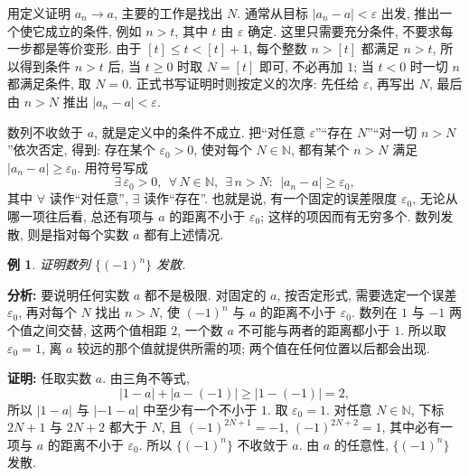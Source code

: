 \documentclass[UTF8,openany]{ctexbook}
\theoremstyle{chinesetextbook}
\newtheorem{example}{例}[section]
\newenvironment{cnproof}{\par\indent\textbf{证明:} \ignorespaces}{\par}
\begin{document}
用定义证明 $a_n\to a$, 主要的工作是找出 $N$. 通常从目标 $|a_n-a|<\varepsilon$ 出发, 推出一个使它成立的条件, 例如 $n>t$, 其中 $t$ 由 $\varepsilon$ 确定. 这里只需要充分条件, 不要求每一步都是等价变形. 由于 $[t]\le t<[t]+1$, 每个整数 $n>[t]$ 都满足 $n>t$, 所以得到条件 $n>t$ 后, 当 $t\ge0$ 时取 $N=[t]$ 即可, 不必再加 $1$; 当 $t<0$ 时一切 $n$ 都满足条件, 取 $N=0$. 正式书写证明时则按定义的次序: 先任给 $\varepsilon$, 再写出 $N$, 最后由 $n>N$ 推出 $|a_n-a|<\varepsilon$.

数列不收敛于 $a$, 就是定义中的条件不成立. 把“对任意 $\varepsilon$”“存在 $N$”“对一切 $n>N$”依次否定, 得到: 存在某个 $\varepsilon_0>0$, 使对每个 $N\in\mathbb N$, 都有某个 $n>N$ 满足 $|a_n-a|\ge\varepsilon_0$. 用符号写成
\[
\exists\,\varepsilon_0>0,\ \ \forall\,N\in\mathbb N,\ \ \exists\,n>N:\ \ |a_n-a|\ge\varepsilon_0,
\]
其中 $\forall$ 读作“对任意”, $\exists$ 读作“存在”. 也就是说, 有一个固定的误差限度 $\varepsilon_0$, 无论从哪一项往后看, 总还有项与 $a$ 的距离不小于 $\varepsilon_0$; 这样的项因而有无穷多个. 数列发散, 则是指对每个实数 $a$ 都有上述情况.
\begin{example}
证明数列 $\{(-1)^n\}$ 发散.
\end{example}
\par\indent\textbf{分析:} 要说明任何实数 $a$ 都不是极限. 对固定的 $a$, 按否定形式, 需要选定一个误差 $\varepsilon_0$, 再对每个 $N$ 找出 $n>N$, 使 $(-1)^n$ 与 $a$ 的距离不小于 $\varepsilon_0$. 数列在 $1$ 与 $-1$ 两个值之间交替, 这两个值相距 $2$, 一个数 $a$ 不可能与两者的距离都小于 $1$. 所以取 $\varepsilon_0=1$, 离 $a$ 较远的那个值就提供所需的项; 两个值在任何位置以后都会出现.
\begin{cnproof}
任取实数 $a$. 由三角不等式,
\[
|1-a|+|a-(-1)|\ge|1-(-1)|=2,
\]
所以 $|1-a|$ 与 $|-1-a|$ 中至少有一个不小于 $1$. 取 $\varepsilon_0=1$. 对任意 $N\in\mathbb N$, 下标 $2N+1$ 与 $2N+2$ 都大于 $N$, 且 $(-1)^{2N+1}=-1$, $(-1)^{2N+2}=1$, 其中必有一项与 $a$ 的距离不小于 $\varepsilon_0$. 所以 $\{(-1)^n\}$ 不收敛于 $a$. 由 $a$ 的任意性, $\{(-1)^n\}$ 发散.
\end{cnproof}
\end{document}
